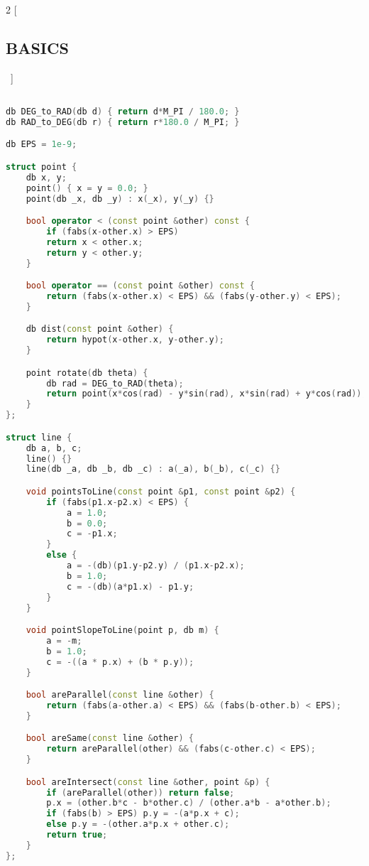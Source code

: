 \documentclass[leter]{amsart}
\begin{document}
\begin{multicols}{2}
[\subsection{BASICS}\ ]
\begin{lstlisting}[language=C++]

db DEG_to_RAD(db d) { return d*M_PI / 180.0; }
db RAD_to_DEG(db r) { return r*180.0 / M_PI; }

db EPS = 1e-9;

struct point {
    db x, y;
    point() { x = y = 0.0; }
    point(db _x, db _y) : x(_x), y(_y) {}

    bool operator < (const point &other) const { 
        if (fabs(x-other.x) > EPS) 
        return x < other.x;
        return y < other.y; 
    }

    bool operator == (const point &other) const {
        return (fabs(x-other.x) < EPS) && (fabs(y-other.y) < EPS);
    }

    db dist(const point &other) { 
        return hypot(x-other.x, y-other.y);
    }

    point rotate(db theta) { 
        db rad = DEG_to_RAD(theta);
        return point(x*cos(rad) - y*sin(rad), x*sin(rad) + y*cos(rad));
    }
};

struct line {
    db a, b, c;
    line() {}
    line(db _a, db _b, db _c) : a(_a), b(_b), c(_c) {}

    void pointsToLine(const point &p1, const point &p2) {
        if (fabs(p1.x-p2.x) < EPS) {
            a = 1.0;
            b = 0.0;
            c = -p1.x;
        }
        else {
            a = -(db)(p1.y-p2.y) / (p1.x-p2.x);
            b = 1.0;
            c = -(db)(a*p1.x) - p1.y;
        }
    }

    void pointSlopeToLine(point p, db m) {
        a = -m; 
        b = 1.0; 
        c = -((a * p.x) + (b * p.y)); 
    }

    bool areParallel(const line &other) {
        return (fabs(a-other.a) < EPS) && (fabs(b-other.b) < EPS);
    }

    bool areSame(const line &other) {
        return areParallel(other) && (fabs(c-other.c) < EPS);
    }

    bool areIntersect(const line &other, point &p) {
        if (areParallel(other)) return false;
        p.x = (other.b*c - b*other.c) / (other.a*b - a*other.b);
        if (fabs(b) > EPS) p.y = -(a*p.x + c);
        else p.y = -(other.a*p.x + other.c);
        return true;
    }
};


\end{lstlisting}
\end{multicols}
\end{document}
